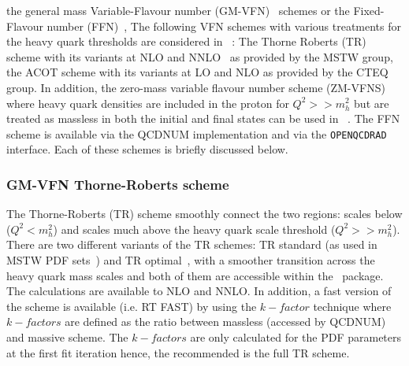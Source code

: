 the general mass Variable-Flavour number (GM-VFN)~\cite{VFN} schemes or the
Fixed-Flavour number (FFN)~\cite{Laenen:1992, Laenen:1993, Riem:1995}, 
%
The following VFN schemes with various treatments for the heavy 
quark thresholds are considered in \fitter\ :
The Thorne Roberts (TR) scheme with its variants at NLO and
NNLO~\cite{Thorne:1997ga,Thorne:2006qt} as provided by the MSTW group,
the ACOT scheme with its variants at LO and NLO as provided by the CTEQ group. 
In addition, the zero-mass variable flavour number scheme (ZM-VFNS) where 
heavy quark densities are included in the proton for $Q^2>>m_h^2$ but are treated 
as massless in both the initial and final states can be used in \fitter\ .
The FFN scheme is available via the QCDNUM implementation and via the 
{\tt OPENQCDRAD}~\cite{openqcdrad:page} interface.
Each of these schemes is briefly discussed below.

\subsubsection{GM-VFN Thorne-Roberts scheme}

The Thorne-Roberts (TR) scheme smoothly connect the two regions: 
scales below ($Q^2<m_h^2$) and scales much above the heavy quark scale threshold ($Q^2>>m_h^2$). 
There are two different variants of the TR schemes: TR standard (as used in MSTW PDF 
sets~\cite{Thorne:2006qt,Martin:epC63}) 
and TR optimal~\cite{Thorne:6180}, with a smoother transition across the heavy quark mass scales 
and both of them are accessible within the \fitter\ package.
The calculations are available to NLO and NNLO. In addition, a fast version of the scheme 
is available (i.e. RT FAST) by using the $k-factor$ technique where $k-factors$ are defined 
as the ratio between massless (accessed by QCDNUM) and massive scheme. 
The $k-factors$ are only calculated for the PDF parameters at the first fit iteration
hence, the recommended is the full TR scheme.
